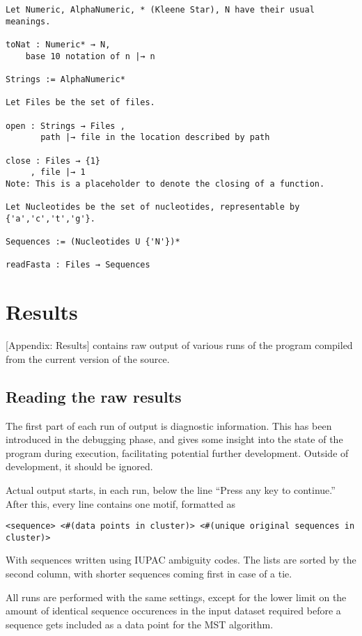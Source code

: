 \documentclass[fleqn]{book}
\begin{document}
\begin{verbatim}
Let Numeric, AlphaNumeric, * (Kleene Star), N have their usual meanings.

toNat : Numeric* → N,
    base 10 notation of n |→ n

Strings := AlphaNumeric*

Let Files be the set of files.

open : Strings → Files ,
       path |→ file in the location described by path

close : Files → {1}
     , file |→ 1
Note: This is a placeholder to denote the closing of a function.

Let Nucleotides be the set of nucleotides, representable by
{'a','c','t','g'}.

Sequences := (Nucleotides U {'N'})*

readFasta : Files → Sequences
\end{verbatim}

\chapter{Results}\label{results}

{[}Appendix: Results{]} contains raw output of various runs of the
program compiled from the current version of the source.

\section{Reading the raw results}\label{reading-the-raw-results}

The first part of each run of output is diagnostic information. This has
been introduced in the debugging phase, and gives some insight into the
state of the program during execution, facilitating potential further
development. Outside of development, it should be ignored.

Actual output starts, in each run, below the line ``Press any key to
continue.'' After this, every line contains one motif, formatted as

\begin{verbatim}
<sequence> <#(data points in cluster)> <#(unique original sequences in cluster)>
\end{verbatim}

With sequences written using IUPAC ambiguity codes. The lists are sorted
by the second column, with shorter sequences coming first in case of a
tie.

All runs are performed with the same settings, except for the lower
limit on the amount of identical sequence occurences in the input
dataset required before a sequence gets included as a data point for the
MST algorithm.
\end{document}
